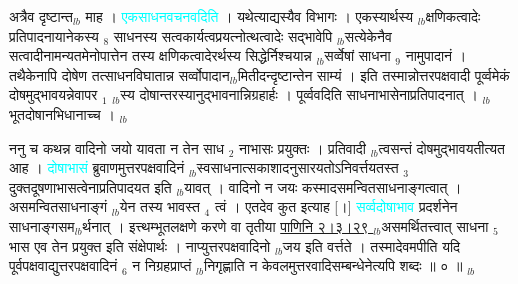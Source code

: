 \documentclass[article,12pt,a4paper]{memoir}%
\newcommand{\quotelemma}[1]{\textcolor{cyan}{#1}}
\newcounter{parCount}
\begin{document}
अत्रैव दृष्टान्त{\tiny $_{lb}$} \leavevmode{} माह । \quotelemma{एकसाधनवचनवदिति} \cite[19a3]{vn-msN} । यथेत्याद्यस्यैव विभागः । एकस्यार्थस्य {\tiny $_{lb}$}क्षणिकत्वादेः प्रतिपादनायानेकस्य {\tiny $_{8}$} साधनस्य सत्वकार्यत्वप्रयत्नोत्थत्वादेः सद्भावेपि {\tiny $_{lb}$}सत्येकेनैव सत्वादीनामन्यतमेनोपात्तेन तस्य क्षणिकत्वादेरर्थस्य सिद्धेर्निश्चयान्न {\tiny $_{lb}$}सर्व्वेषां साधना {\tiny $_{9}$} \leavevmode{} नामुपादानं । तथैकेनापि दोषेण तत्साधनविघातान्न सर्व्वोपादान{\tiny $_{lb}$}मितीदन्दृष्टान्तेन साम्यं । इति तस्मान्नोत्तरपक्षवादी पूर्व्वमेकं दोषमुद्भावयन्नेवापर {\tiny $_{1}$} {\tiny $_{lb}$}स्य दोषान्तरस्यानुद्भावनान्निग्रहार्हः । पूर्व्ववदिति साधनाभासेनाप्रतिपादनात् । {\tiny $_{lb}$}भूतदोषानभिधानाच्च ।
	{}
	\pend%
      {\tiny $_{lb}$}

	  
	  \pstart \leavevmode%
	ननु च कथन्न वादिनो जयो यावता न तेन साध {\tiny $_{2}$} नाभासः प्रयुक्तः । प्रतिवादी {\tiny $_{lb}$}त्वसन्तं दोषमुद्भावयतीत्यत आह । \quotelemma{दोषाभासं} ब्रुवाणमुत्तरपक्षवादिनं \cite[18a4]{vn-msN} {\tiny $_{lb}$}स्वसाधनात्सकाशादनुसारयतोऽनिवर्त्तयतस्त {\tiny $_{3}$} दुक्तदूषणाभासत्वेनाप्रतिपादयत इति {\tiny $_{lb}$}यावत् । वादिनो न जयः कस्मादसमन्वितसाधनाङ्गत्वात् । असमन्वितसाधनाङ्गं {\tiny $_{lb}$}येन तस्य भावस्त {\tiny $_{4}$} त्वं । एतदेव कुत इत्याह [।] \quotelemma{सर्व्वदोषाभाव} प्रदर्शनेन साधनाङ्गसम{\tiny $_{lb}$}र्थनात् \cite[19a5]{vn-msN} । इत्त्थम्भूतलक्षणे करणे वा तृतीया \href{http://sarit.indology.info/?cref=P\%C4\%81.2.3.29}{पाणिनि २।३।२९ } {\tiny $_{lb}$}असमर्थितत्त्वात् साधना {\tiny $_{5}$} भास एव तेन प्रयुक्त इति संक्षेपार्थः । नाप्युत्तरपक्षवादिनो {\tiny $_{lb}$}जय इति वर्त्तते । तस्मादेवमपीति यदि पूर्वपक्षवाद्युत्तरपक्षवादिनं {\tiny $_{6}$} न निग्रहप्राप्तं {\tiny $_{lb}$}निगृह्णाति न केवलमुत्तरवादिसम्बन्धेनेत्यपि शब्दः ॥ ० ॥
	{}
	\pend%
      {\tiny $_{lb}$}
\end{document}
